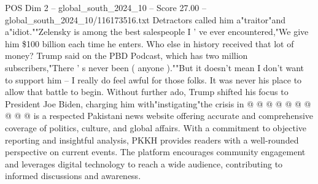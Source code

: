 \begin{textsample}{POS Dim 2 – global\_south\_2024\_10 – Score 27.00 – global\_south\_2024\_10/116173516.txt}
Detractors called him a"traitor"and a"idiot.""Zelensky is among the best salespeople I ' ve ever encountered,"We give him \$100 billion each time he enters.
Who else in history received that lot of money?
Trump said on the PBD Podcast, which has two million subscribers,"There ' s never been ( anyone ).""But it doesn't mean I don't want to support him -- I really do feel awful for those folks.
It was never his place to allow that battle to begin.
Without further ado, Trump shifted his focus to President Joe Biden, charging him with"instigating"the crisis in @ @ @ @ @ @ @ @ @ @ is a respected Pakistani news website offering accurate and comprehensive coverage of politics, culture, and global affairs.
With a commitment to objective reporting and insightful analysis, PKKH provides readers with a well-rounded perspective on current events.
The platform encourages community engagement and leverages digital technology to reach a wide audience, contributing to informed discussions and awareness.

\end{textsample}
